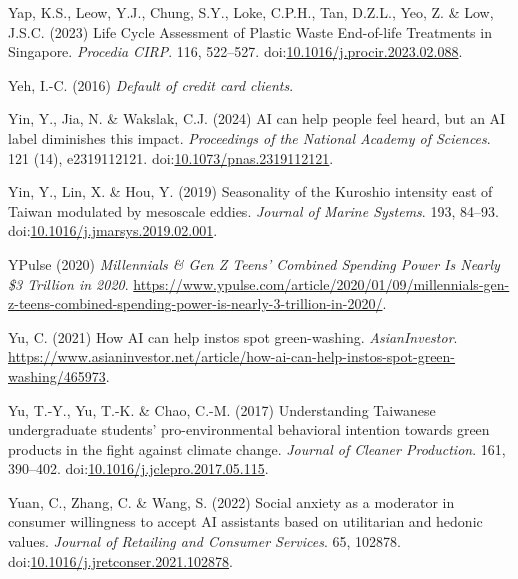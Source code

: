 \documentclass[
  letterpaper,
  DIV=11,
  numbers=noendperiod]{scrartcl}
\newlength{\cslhangindent}
\newenvironment{CSLReferences}[2] %
 {\begin{list}{}{%
  \setlength{\itemindent}{0pt}
  \setlength{\leftmargin}{0pt}
  \setlength{\parsep}{0pt}
  \ifodd #1
   \setlength{\leftmargin}{\cslhangindent}
   \setlength{\itemindent}{-1\cslhangindent}
  \fi
  \setlength{\itemsep}{#2\baselineskip}}}
 {\end{list}}
\begin{document}
\begin{CSLReferences}{0}{1}
Yap, K.S., Leow, Y.J., Chung, S.Y., Loke, C.P.H., Tan, D.Z.L., Yeo, Z.
\& Low, J.S.C. (2023) Life {Cycle Assessment} of {Plastic Waste
End-of-life Treatments} in {Singapore}. \emph{Procedia CIRP}. 116,
522--527.
doi:\href{https://doi.org/10.1016/j.procir.2023.02.088}{10.1016/j.procir.2023.02.088}.

Yeh, I.-C. (2016) \emph{Default of credit card clients}.

Yin, Y., Jia, N. \& Wakslak, C.J. (2024) {AI} can help people feel
heard, but an {AI} label diminishes this impact. \emph{Proceedings of
the National Academy of Sciences}. 121 (14), e2319112121.
doi:\href{https://doi.org/10.1073/pnas.2319112121}{10.1073/pnas.2319112121}.

Yin, Y., Lin, X. \& Hou, Y. (2019) Seasonality of the {Kuroshio}
intensity east of {Taiwan} modulated by mesoscale eddies. \emph{Journal
of Marine Systems}. 193, 84--93.
doi:\href{https://doi.org/10.1016/j.jmarsys.2019.02.001}{10.1016/j.jmarsys.2019.02.001}.

YPulse (2020) \emph{Millennials \& {Gen Z Teens}' {Combined Spending
Power Is Nearly} \$3 {Trillion} in 2020}.
\url{https://www.ypulse.com/article/2020/01/09/millennials-gen-z-teens-combined-spending-power-is-nearly-3-trillion-in-2020/}.

Yu, C. (2021) How {AI} can help instos spot green-washing.
\emph{AsianInvestor}.
\url{https://www.asianinvestor.net/article/how-ai-can-help-instos-spot-green-washing/465973}.

Yu, T.-Y., Yu, T.-K. \& Chao, C.-M. (2017) Understanding {Taiwanese}
undergraduate students' pro-environmental behavioral intention towards
green products in the fight against climate change. \emph{Journal of
Cleaner Production}. 161, 390--402.
doi:\href{https://doi.org/10.1016/j.jclepro.2017.05.115}{10.1016/j.jclepro.2017.05.115}.

Yuan, C., Zhang, C. \& Wang, S. (2022) Social anxiety as a moderator in
consumer willingness to accept {AI} assistants based on utilitarian and
hedonic values. \emph{Journal of Retailing and Consumer Services}. 65,
102878.
doi:\href{https://doi.org/10.1016/j.jretconser.2021.102878}{10.1016/j.jretconser.2021.102878}.


\end{CSLReferences}
\end{document}

